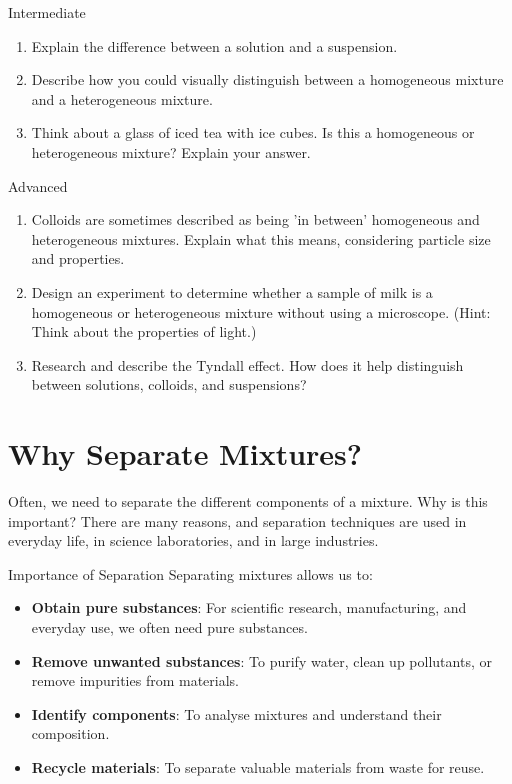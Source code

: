 \begin{tieredquestions}{Intermediate}
\begin{enumerate}
    \item Explain the difference between a solution and a suspension.
    \item Describe how you could visually distinguish between a homogeneous mixture and a heterogeneous mixture.
    \item  Think about a glass of iced tea with ice cubes. Is this a homogeneous or heterogeneous mixture? Explain your answer.
\end{enumerate}
\end{tieredquestions}

\begin{tieredquestions}{Advanced}
\begin{enumerate}
    \item  Colloids are sometimes described as being 'in between' homogeneous and heterogeneous mixtures. Explain what this means, considering particle size and properties.
    \item  Design an experiment to determine whether a sample of milk is a homogeneous or heterogeneous mixture without using a microscope. (Hint: Think about the properties of light.)
    \item  Research and describe the Tyndall effect. How does it help distinguish between solutions, colloids, and suspensions?
\end{enumerate}
\end{tieredquestions}


\section{Why Separate Mixtures?}


Often, we need to separate the different components of a mixture.  Why is this important? There are many reasons, and separation techniques are used in everyday life, in science laboratories, and in large industries.

\begin{keyconcept}{Importance of Separation}
Separating mixtures allows us to:
\begin{itemize}
    \item \textbf{Obtain pure substances}:  For scientific research, manufacturing, and everyday use, we often need pure substances.
    \item \textbf{Remove unwanted substances}:  To purify water, clean up pollutants, or remove impurities from materials.
    \item \textbf{Identify components}:  To analyse mixtures and understand their composition.
    \item \textbf{Recycle materials}: To separate valuable materials from waste for reuse.
\end{itemize}
\end{keyconcept}

